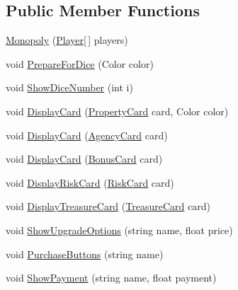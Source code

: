 \subsection*{Public Member Functions}
\begin{DoxyCompactItemize}
\item 
\mbox{\hyperlink{class_monopoly_1_1_main_1_1_monopoly_a3b9d422d35cc8474d3d494deb31ea843}{Monopoly}} (\mbox{\hyperlink{class_monopoly_1_1_players_1_1_player}{Player}}\mbox{[}$\,$\mbox{]} players)
\item 
void \mbox{\hyperlink{class_monopoly_1_1_main_1_1_monopoly_af6f48b4426f581ad1893a5aa56cb43b1}{Prepare\+For\+Dice}} (Color color)
\item 
void \mbox{\hyperlink{class_monopoly_1_1_main_1_1_monopoly_a6c2b32e988efdb04b4d2e8728b904642}{Show\+Dice\+Number}} (int i)
\item 
void \mbox{\hyperlink{class_monopoly_1_1_main_1_1_monopoly_af32328d31409f20d07c0debb9beb99ce}{Display\+Card}} (\mbox{\hyperlink{class_monopoly_1_1_main_1_1_property_card}{Property\+Card}} card, Color color)
\item 
void \mbox{\hyperlink{class_monopoly_1_1_main_1_1_monopoly_aec8aafb2bef6a91c151f0b0ea199ecae}{Display\+Card}} (\mbox{\hyperlink{class_monopoly_1_1_cards_1_1_agency_card}{Agency\+Card}} card)
\item 
void \mbox{\hyperlink{class_monopoly_1_1_main_1_1_monopoly_a85b6aeaa8f1736e2e708631db2ff27f3}{Display\+Card}} (\mbox{\hyperlink{class_monopoly_1_1_cards_1_1_bonus_card}{Bonus\+Card}} card)
\item 
void \mbox{\hyperlink{class_monopoly_1_1_main_1_1_monopoly_af4bd81cff0c63b2e917d18eb7352b8f9}{Display\+Risk\+Card}} (\mbox{\hyperlink{class_monopoly_1_1_main_1_1_risk_card}{Risk\+Card}} card)
\item 
void \mbox{\hyperlink{class_monopoly_1_1_main_1_1_monopoly_af986f85540fd67a1d3a14391d5a942c7}{Display\+Treasure\+Card}} (\mbox{\hyperlink{class_monopoly_1_1_main_1_1_treasure_card}{Treasure\+Card}} card)
\item 
void \mbox{\hyperlink{class_monopoly_1_1_main_1_1_monopoly_ae27417b56bcafce0ef77cc69f6256156}{Show\+Upgrade\+Options}} (string name, float price)
\item 
void \mbox{\hyperlink{class_monopoly_1_1_main_1_1_monopoly_a08fd192c3e290de91a2d248de111e73b}{Purchase\+Buttons}} (string name)
\item 
void \mbox{\hyperlink{class_monopoly_1_1_main_1_1_monopoly_aa4d4c8d2749d4296b7a58adb91003cd1}{Show\+Payment}} (string name, float payment)

\end{DoxyCompactItemize}
